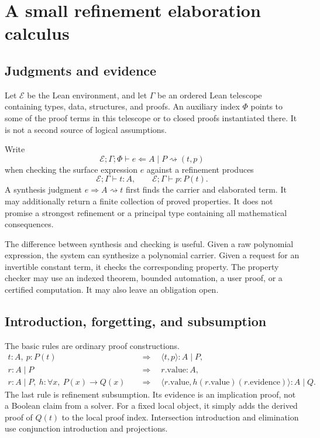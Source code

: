 \documentclass[11pt,a4paper]{article}
\newcommand{\where}{\mathrel{\vert}}
\theoremstyle{plain}
\theoremstyle{definition}
\begin{document}
\section{A small refinement elaboration calculus}\label{sec:calculus}

\subsection{Judgments and evidence}
Let $\mathcal E$ be the Lean environment, and let $\Gamma$ be an ordered Lean telescope containing types, data, structures, and proofs. An auxiliary index $\Phi$ points to some of the proof terms in this telescope or to closed proofs instantiated there. It is not a second source of logical assumptions.

Write
\[
 \mathcal E;\Gamma;\Phi\vdash e\Leftarrow A\where P
       \rightsquigarrow (t,p)
\]
when checking the surface expression $e$ against a refinement produces
\[
 \mathcal E;\Gamma\vdash t:A,
 \qquad \mathcal E;\Gamma\vdash p:P(t).
\]
A synthesis judgment $e\Rightarrow A\rightsquigarrow t$ first finds the carrier and elaborated term. It may additionally return a finite collection of proved properties. It does not promise a strongest refinement or a principal type containing all mathematical consequences.

The difference between synthesis and checking is useful. Given a raw polynomial expression, the system can synthesize a polynomial carrier. Given a request for an invertible constant term, it checks the corresponding property. The property checker may use an indexed theorem, bounded automation, a user proof, or a certified computation. It may also leave an obligation open.

\subsection{Introduction, forgetting, and subsumption}
The basic rules are ordinary proof constructions.
\begin{align*}
 t:A,\ p:P(t)
   &\quad\Longrightarrow\quad \langle t,p\rangle:A\where P,\\
 r:A\where P
   &\quad\Longrightarrow\quad r.\mathrm{value}:A,\\
 r:A\where P,\ h:\forall x,\ P(x)\to Q(x)
   &\quad\Longrightarrow\quad
       \langle r.\mathrm{value},h(r.\mathrm{value})(r.\mathrm{evidence})\rangle:A\where Q.
\end{align*}
The last rule is refinement subsumption. Its evidence is an implication proof, not a Boolean claim from a solver. For a fixed local object, it simply adds the derived proof of $Q(t)$ to the local proof index. Intersection introduction and elimination use conjunction introduction and projections.
\end{document}
